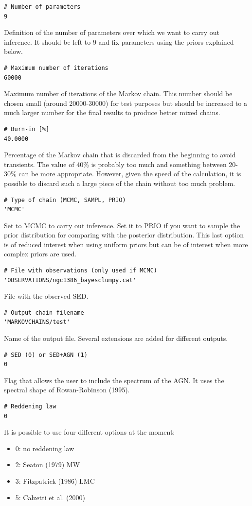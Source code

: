 \documentclass[12pt]{article}
\begin{document}
\begin{verbatim}
# Number of parameters
9
\end{verbatim}
Definition of the number of parameters over which we want to carry out inference. It should
be left to 9 and fix parameters using the priors explained below.

\begin{verbatim}
# Maximum number of iterations
60000
\end{verbatim}
Maximum number of iterations of the Markov chain. This number should be chosen small (around 20000-30000) for
test purposes but should be increased to a much larger number for the final results to produce
better mixed chains.

\begin{verbatim}
# Burn-in [%]
40.0000
\end{verbatim}
Percentage of the Markov chain that is discarded from the beginning to avoid
transients. The value of 40\% is probably too much and something between 20-30\% can be
more appropriate. However, given the speed of the calculation, it is possible to
discard such a large piece of the chain without too much problem.

\begin{verbatim}
# Type of chain (MCMC, SAMPL, PRIO)
'MCMC'
\end{verbatim}
Set to MCMC to carry out inference. Set it to PRIO if you want to sample the prior distribution
for comparing with the posterior distribution. This last option is of reduced interest when
using uniform priors but can be of interest when more complex priors are used.

\begin{verbatim}
# File with observations (only used if MCMC)
'OBSERVATIONS/ngc1386_bayesclumpy.cat'
\end{verbatim}
File with the observed SED.

\begin{verbatim}
# Output chain filename
'MARKOVCHAINS/test'
\end{verbatim}
Name of the output file. Several extensions are added for different outputs.

\begin{verbatim}
# SED (0) or SED+AGN (1)
0
\end{verbatim}
Flag that allows the user to include the spectrum of the AGN. It uses
the spectral shape of Rowan-Robinson (1995).

\begin{verbatim}
# Reddening law
0
\end{verbatim}
It is possible to use four different options at the moment:
\begin{itemize}
 \item 0: no reddening law
 \item 2: Seaton (1979) MW
 \item 3: Fitzpatrick (1986) LMC
 \item 5: Calzetti et al. (2000)
\end{itemize}
\end{document}
